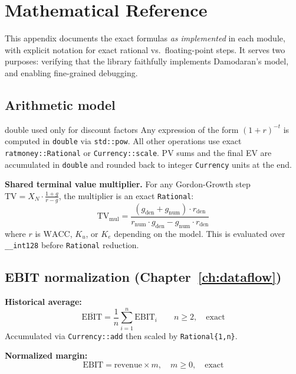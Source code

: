 \documentclass[12pt, a4paper, oneside]{book}
\newcommand{\EBIT}{\ensuremath{\mathrm{EBIT}}}
\newcommand{\WACC}{\ensuremath{\mathrm{WACC}}}
\newcommand{\TV}{\ensuremath{\mathrm{TV}}}
\newcommand{\Ke}{K_e}
\newcommand{\Ku}{K_u}
\begin{document}
\chapter{Mathematical Reference}
\label{app:math}

This appendix documents the exact formulas \emph{as implemented} in each
module, with explicit notation for exact rational vs.\ floating-point steps.
It serves two purposes: verifying that the library faithfully implements
Damodaran's model, and enabling fine-grained debugging.

\section{Arithmetic model}

\begin{impl}{double used only for discount factors}
Any expression of the form $(1+r)^{-t}$ is computed in \texttt{double}
via \texttt{std::pow}.  All other operations use exact
\texttt{ratmoney::Rational} or \texttt{Currency::scale}.
PV sums and the final EV are accumulated in \texttt{double} and rounded
back to integer \texttt{Currency} units at the end.
\end{impl}

\textbf{Shared terminal value multiplier.}
For any Gordon-Growth step $\TV = X_N \cdot \tfrac{1+g}{r-g}$, the
multiplier is an exact \texttt{Rational}:
\begin{equation}
  \TV_{\mathrm{mul}}
  = \frac{(g_{\mathrm{den}}+g_{\mathrm{num}})\cdot r_{\mathrm{den}}}
         {r_{\mathrm{num}}\cdot g_{\mathrm{den}}
          - g_{\mathrm{num}}\cdot r_{\mathrm{den}}}
  \label{eq:tv_mul_app}
\end{equation}
where $r$ is $\WACC$, $\Ku$, or $\Ke$ depending on the model.
This is evaluated over \texttt{\_\_int128} before \texttt{Rational}
reduction.

\section{EBIT normalization (Chapter~\ref{ch:dataflow})}

\textbf{Historical average:}
\begin{equation}
  \overline{\EBIT} = \frac{1}{n}\sum_{i=1}^{n}\EBIT_i
  \qquad n\geq 2,\quad\text{exact}
\end{equation}
Accumulated via \texttt{Currency::add} then scaled by
\texttt{Rational\{1,n\}}.

\textbf{Normalized margin:}
\begin{equation}
  \EBIT = \text{revenue} \times m,\quad m\geq 0,\quad\text{exact}
\end{equation}
\end{document}
